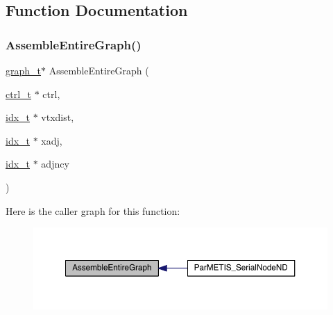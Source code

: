 \subsection{Function Documentation}
\mbox{\label{a00389_a2bca72c51127ef49eece3ae89414b6b6}} 
\subsubsection{\texorpdfstring{Assemble\+Entire\+Graph()}{AssembleEntireGraph()}}
{\footnotesize\ttfamily \hyperlink{a00734}{graph\+\_\+t}$\ast$ Assemble\+Entire\+Graph (\begin{DoxyParamCaption}\item[{\hyperlink{a00742}{ctrl\+\_\+t} $\ast$}]{ctrl,  }\item[{\hyperlink{a00876_aaa5262be3e700770163401acb0150f52}{idx\+\_\+t} $\ast$}]{vtxdist,  }\item[{\hyperlink{a00876_aaa5262be3e700770163401acb0150f52}{idx\+\_\+t} $\ast$}]{xadj,  }\item[{\hyperlink{a00876_aaa5262be3e700770163401acb0150f52}{idx\+\_\+t} $\ast$}]{adjncy }\end{DoxyParamCaption})}

Here is the caller graph for this function\+:\nopagebreak
\begin{figure}[H]
\begin{center}
\leavevmode
\includegraphics[width=350pt]{a00389_a2bca72c51127ef49eece3ae89414b6b6_icgraph}
\end{center}
\end{figure}
\mbox{\label{a00389_a5ea6a6f60f172d69aae0c4bace99a5ae}} 
